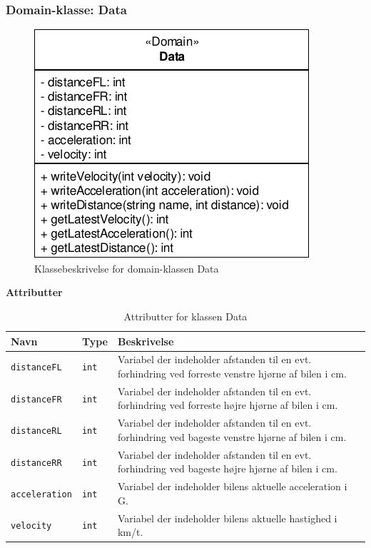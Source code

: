 \subsubsection{Domain-klasse: Data}

\begin{figure}[h]
\centering
\includegraphics[]{../fig/diagrammer/bil/cd_data.pdf}
\caption{Klassebeskrivelse for domain-klassen Data}
\label{fig:cd_data}
\end{figure}

\textbf{Attributter}

\begin{table}[h]
\begin{tabularx}{\textwidth}{| Z | Z | L{10cm} |} \hline
Navn & Type & Beskrivelse \\\hline
\texttt{distanceFL} & \texttt{int} &Variabel der indeholder afstanden til en evt. forhindring ved forreste venstre hjørne af bilen i cm.\\\hline
\texttt{distanceFR} & \texttt{int} &Variabel der indeholder afstanden til en evt. forhindring ved forreste højre hjørne af bilen i cm.\\\hline
\texttt{distanceRL} & \texttt{int} &Variabel der indeholder afstanden til en evt. forhindring ved bageste venstre hjørne af bilen i cm.\\\hline
\texttt{distanceRR} & \texttt{int} &Variabel der indeholder afstanden til en evt. forhindring ved bageste højre hjørne af bilen i cm.\\\hline
\texttt{acceleration} & \texttt{int} &Variabel der indeholder bilens aktuelle acceleration i G.\\\hline
\texttt{velocity} & \texttt{int} &Variabel der indeholder bilens aktuelle hastighed i km/t.\\\hline
\end{tabularx}
\caption{Attributter for klassen Data}
\label{table:attr_data}
\end{table}

